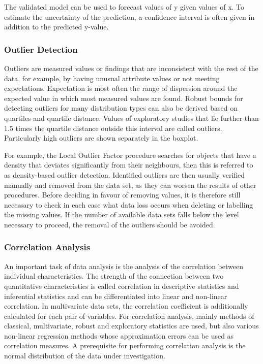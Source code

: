 \bigskip
The validated model can be used to forecast values of y given values of x. To estimate the uncertainty of the prediction, a confidence interval is often given in addition to the predicted y-value.


\subsubsection{Outlier Detection}

Outliers are measured values or findings that are inconsistent with the rest of the data, for example, by having unusual attribute values or not meeting expectations. Expectation is most often the range of dispersion around the expected value in which most measured values are found. \glqq Robust bounds for detecting outliers for many distribution types can also be derived based on quartiles and quartile distance.\grqq \cite{Sachs:2006} Values of exploratory studies that lie further than 1.5 times the quartile distance outside this interval are called outliers. Particularly high outliers are shown separately in the boxplot.

For example, the Local Outlier Factor procedure searches for objects that have a density that deviates significantly from their neighbours, then this is referred to as density-based outlier detection. Identified outliers are then usually verified manually and removed from the data set, as they can worsen the results of other procedures. Before deciding in favour of removing values, it is therefore still necessary to check in each case what data loss occurs when deleting or labelling the missing values. If the number of available data sets falls below the level necessary to proceed, the removal of the outliers should be avoided.

	
\subsubsection{Correlation Analysis}

An important task of data analysis is the analysis of the correlation between individual characteristics. The strength of the connection between two quantitative characteristics is called correlation in descriptive statistics and inferential statistics and can be differentiated into linear and non-linear correlation. In multivariate data sets, the correlation coefficient is additionally calculated for each pair of variables.\cite{Goettingen} \glqq For correlation analysis, mainly methods of classical, multivariate, robust and exploratory statistics are used, but also various non-linear regression methods whose approximation errors can be used as correlation measures.\grqq \cite{Runkler.2015} A prerequisite for performing correlation analysis is the normal distribution of the data under investigation.

